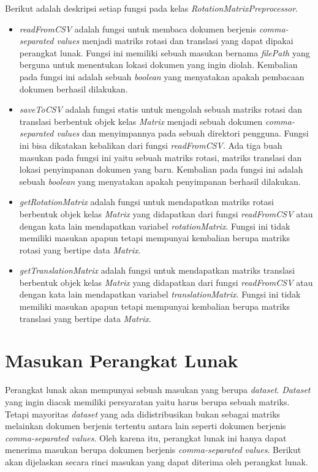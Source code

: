 Berikut adalah deskripsi setiap fungsi pada kelas \textit{RotationMatrixPreprocessor}.
\begin{itemize}
	\item \textit{readFromCSV} adalah fungsi untuk membaca dokumen berjenis \textit{comma-separated values} menjadi matriks rotasi dan translasi yang dapat dipakai perangkat lunak. Fungsi ini memiliki sebuah masukan bernama \textit{filePath} yang berguna untuk menentukan lokasi dokumen yang ingin diolah. Kembalian pada fungsi ini adalah sebuah \textit{boolean} yang menyatakan apakah pembacaan dokumen berhasil dilakukan.
	\item \textit{saveToCSV} adalah fungsi statis untuk mengolah sebuah matriks rotasi dan translasi berbentuk objek kelas \textit{Matrix} menjadi sebuah dokumen \textit{comma-separated values} dan menyimpannya pada sebuah direktori pengguna. Fungsi ini bisa dikatakan kebalikan dari fungsi \textit{readFromCSV}. Ada tiga buah masukan pada fungsi ini yaitu sebuah matriks rotasi, matriks translasi dan lokasi penyimpanan dokumen yang baru. Kembalian pada fungsi ini adalah sebuah \textit{boolean} yang menyatakan apakah penyimpanan berhasil dilakukan.
	\item \textit{getRotationMatrix} adalah fungsi untuk mendapatkan matriks rotasi berbentuk objek kelas \textit{Matrix} yang didapatkan dari fungsi \textit{readFromCSV} atau dengan kata lain mendapatkan variabel \textit{rotationMatrix}. Fungsi ini tidak memiliki masukan apapun tetapi mempunyai kembalian berupa matriks rotasi yang bertipe data \textit{Matrix}.
	\item \textit{getTranslationMatrix} adalah fungsi untuk mendapatkan matriks translasi berbentuk objek kelas \textit{Matrix} yang didapatkan dari fungsi \textit{readFromCSV} atau dengan kata lain mendapatkan variabel \textit{translationMatrix}. Fungsi ini tidak memiliki masukan apapun tetapi mempunyai kembalian berupa matriks translasi yang bertipe data \textit{Matrix}.
\end{itemize}

\section{Masukan Perangkat Lunak}
\label{sec:masukan-pl}

Perangkat lunak akan mempunyai sebuah masukan yang berupa \textit{dataset}. \textit{Dataset} yang ingin diacak memiliki persyaratan yaitu harus berupa sebuah matriks. Tetapi mayoritas \textit{dataset} yang ada didistribusikan bukan sebagai matriks melainkan dokumen berjenis tertentu antara lain seperti dokumen berjenis \textit{comma-separated values}. Oleh karena itu, perangkat lunak ini hanya dapat menerima masukan berupa dokumen berjenis \textit{comma-separated values}. Berikut akan dijelaskan secara rinci masukan yang dapat diterima oleh perangkat lunak.

